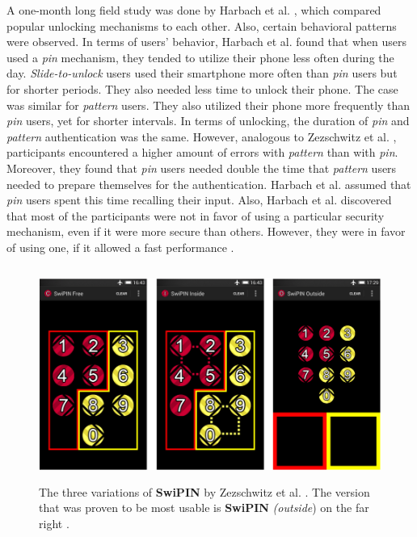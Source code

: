 A one-month long field study was done by Harbach et al. \cite{AnatomySmartphone}, which compared popular unlocking mechanisms to each other. Also, certain behavioral patterns were observed. In terms of users' behavior, Harbach et al. \cite{AnatomySmartphone} found that when users used a \textit{pin} mechanism, they tended to utilize their phone less often during the day. \textit{Slide-to-unlock} users used their smartphone more often than \textit{pin} users but for shorter periods. They also needed less time to unlock their phone. The case was similar for \textit{pattern} users. They also utilized their phone more frequently than \textit{pin} users, yet for shorter intervals. In terms of unlocking, the duration of \textit{pin} and \textit{pattern} authentication was the same. However, analogous to Zezschwitz et al. \cite{PatternWild}, participants encountered a higher amount of errors with \textit{pattern} than with \textit{pin}.
Moreover, they found that \textit{pin} users needed double the time that \textit{pattern} users needed to prepare themselves for the authentication. Harbach et al. \cite{AnatomySmartphone} assumed that \textit{pin} users spent this time recalling their input. Also, Harbach et al. \cite{AnatomySmartphone} discovered that most of the participants were not in favor of using a particular security mechanism, even if it were more secure than others. However, they were in favor of using one, if it allowed a fast performance  \cite{AnatomySmartphone,Albayram:2017:BUL:3235924.3235929}.

\begin{figure}[t!]
\centering
\includegraphics[width=13cm, height=7cm]{Chapters/graphics/swipin.PNG}
\caption{The three variations of \textbf{SwiPIN} by Zezschwitz et al. \cite{Swipin}. The version that was proven to be most usable is \textbf{SwiPIN} \textit{(outside}) on the far right \cite{Swipin}. }
\label{fig:swipin}
\end{figure}


